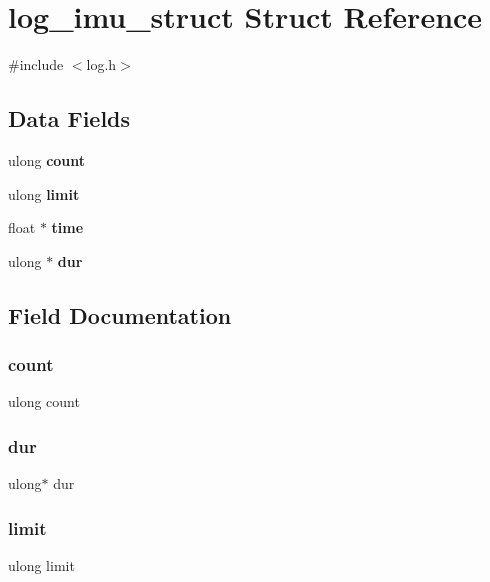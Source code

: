 \section{log\+\_\+imu\+\_\+struct Struct Reference}
\label{structlog__imu__struct}


{\ttfamily \#include $<$log.\+h$>$}

\subsection*{Data Fields}
\begin{DoxyCompactItemize}
\item 
ulong \textbf{ count}
\item 
ulong \textbf{ limit}
\item 
float $\ast$ \textbf{ time}
\item 
ulong $\ast$ \textbf{ dur}
\end{DoxyCompactItemize}


\subsection{Field Documentation}
\mbox{\label{structlog__imu__struct_aec2cfcb08132e96314e07b96dcda60fe}} 
\subsubsection{count}
{\footnotesize\ttfamily ulong count}

\mbox{\label{structlog__imu__struct_a9b72b5e4d4f698f873cbf1cbf431aaa7}} 
\subsubsection{dur}
{\footnotesize\ttfamily ulong$\ast$ dur}

\mbox{\label{structlog__imu__struct_a1aafeaebc23c5017e813ab4816d159e8}} 
\subsubsection{limit}
{\footnotesize\ttfamily ulong limit}

